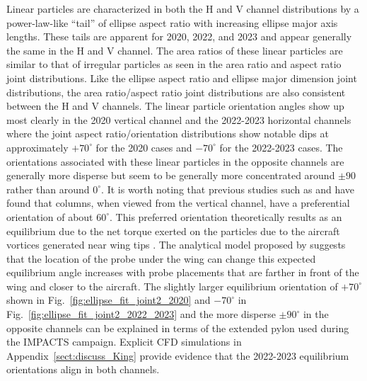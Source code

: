 \documentclass[amt, manuscript]{copernicus}
\begin{document}

Linear particles are characterized in both the H and V channel distributions by a power-law-like ``tail'' of ellipse aspect ratio with increasing ellipse major axis lengths. These tails are apparent for 2020, 2022, and 2023 and appear generally the same in the H and V channel. The area ratios of these linear particles are similar to that of irregular particles as seen in the area ratio and aspect ratio joint distributions. Like the ellipse aspect ratio and ellipse major dimension joint distributions, the area ratio/aspect ratio joint distributions are also consistent between the H and V channels. The linear particle orientation angles show up most clearly in the 2020 vertical channel and the 2022-2023 horizontal channels where the joint aspect ratio/orientation distributions show notable dips at approximately $+70^{\circ}$ for the 2020 cases and $-70^{\circ}$ for the 2022-2023 cases. The orientations associated with these linear particles in the opposite channels are generally more disperse but seem to be generally more concentrated around $\pm 90$ rather than around $0^{\circ}$. It is worth noting that previous studies such as \citet{King1985c,King1985d} and \citet{Obrien2016} have found that columns, when viewed from the vertical channel, have a preferential orientation of about $60^{\circ}$. This preferred orientation theoretically results as an equilibrium due to the net torque exerted on the particles due to the aircraft vortices generated near wing tips \citep{King1985d}. The analytical model proposed by  \citet{King1985d} suggests that the location of the probe under the wing can change this expected equilibrium angle increases with probe placements that are farther in front of the wing and closer to the aircraft. The slightly larger equilibrium orientation of $+70^{\circ}$ shown in Fig.~\ref{fig:ellipse_fit_joint2_2020} and $-70^{\circ}$ in Fig.~\ref{fig:ellipse_fit_joint2_2022_2023} and the more disperse $\pm 90^{\circ}$ in the opposite channels can be explained in terms of the extended pylon used during the IMPACTS campaign. Explicit CFD simulations in Appendix~\ref{sect:discuss_King} provide evidence that the 2022-2023 equilibrium orientations align in both channels.   
\end{document}
